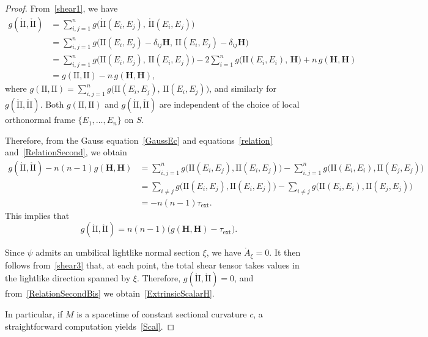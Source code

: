 \documentclass[10pt,a4paper]{amsart}
\begin{document}
\begin{proof}
	From~\eqref{shear1}, we have
	\begin{align}
		g(\mathring{\mathrm{II}}, \mathring{\mathrm{II}})
		&= \sum_{i,j=1}^n g\bigl(\mathring{\mathrm{II}}(E_i, E_j),\, \mathring{\mathrm{II}}(E_i, E_j)\bigr) \nonumber \\
		&= \sum_{i,j=1}^n g\bigl(\mathrm{II}(E_i, E_j) - \delta_{ij} \mathbf{H},\, \mathrm{II}(E_i, E_j) - \delta_{ij} \mathbf{H}\bigr) \nonumber \\
		&= \sum_{i,j=1}^n g\bigl(\mathrm{II}(E_i, E_j),\, \mathrm{II}(E_i, E_j)\bigr) - 2\sum_{i=1}^n g\bigl(\mathrm{II}(E_i, E_i),\, \mathbf{H}\bigr) + n\, g(\mathbf{H}, \mathbf{H}) \nonumber \\
		&= g(\mathrm{II}, \mathrm{II}) - n\, g(\mathbf{H}, \mathbf{H}), \label{RelationSecond}
	\end{align}
	where $g(\mathrm{II}, \mathrm{II}) = \sum_{i,j=1}^n g\bigl(\mathrm{II}(E_i, E_j),\, \mathrm{II}(E_i, E_j)\bigr)$, and similarly for $g(\mathring{\mathrm{II}}, \mathring{\mathrm{II}})$. Both $g(\mathrm{II}, \mathrm{II})$ and $g(\mathring{\mathrm{II}}, \mathring{\mathrm{II}})$ are independent of the choice of local orthonormal frame $\{E_1, \ldots, E_n\}$ on $S$.
	
	Therefore, from the Gauss equation~\eqref{GaussEc} and equations~\eqref{relation} and~\eqref{RelationSecond}, we obtain
	\begin{align*}
		g(\mathring{\mathrm{II}}, \mathring{\mathrm{II}}) - n(n-1) g(\mathbf{H}, \mathbf{H}) 
		&= \sum_{i,j=1}^n g\bigl(\mathrm{II}(E_i, E_j), \mathrm{II}(E_i, E_j)\bigr) - \sum_{i,j=1}^n g\bigl(\mathrm{II}(E_i, E_i), \mathrm{II}(E_j, E_j)\bigr) \\
		&= \sum_{i \neq j} g\bigl(\mathrm{II}(E_i, E_j), \mathrm{II}(E_i, E_j)\bigr) - \sum_{i \neq j} g\bigl(\mathrm{II}(E_i, E_i), \mathrm{II}(E_j, E_j)\bigr) \\
		&= -n(n-1) \tau_{\mathrm{ext}}.
	\end{align*}
	This implies that
	\begin{equation} \label{RelationSecondBis}
		g(\mathring{\mathrm{II}}, \mathring{\mathrm{II}}) = n(n-1) \big( g(\mathbf{H}, \mathbf{H}) - \tau_{\mathrm{ext}} \big).
	\end{equation}
	
	Since $\psi$ admits an umbilical lightlike normal section $\xi$, we have $\mathring{A}_\xi = 0$. It then follows from~\eqref{shear3} that, at each point, the total shear tensor takes values in the lightlike direction spanned by $\xi$. Therefore, $g(\mathring{\mathrm{II}}, \mathring{\mathrm{II}}) = 0$, and from~\eqref{RelationSecondBis} we obtain~\eqref{ExtrinsicScalarH}.
	
	In particular, if $M$ is a spacetime of constant sectional curvature $c$, a straightforward computation yields~\eqref{Scal}.
\end{proof}
\end{document}
